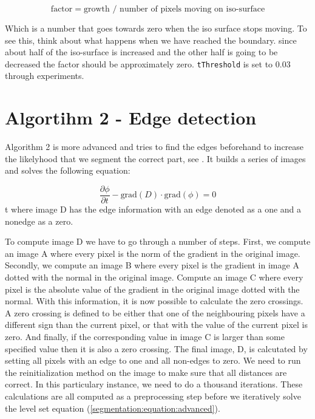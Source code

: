 \begin{equation*}
 \textrm{factor} = \textrm{growth } / \textrm{ number of pixels moving on iso-surface}
\end{equation*}

Which is a number that goes towards zero when the iso surface stops
moving. To see this, think about what happens when we have reached the
boundary. since about half of the iso-surface is increased and the
other half is going to be decreased the factor should be approximately
zero. \texttt{tThreshold} is set to 0.03 through experiments.



\section{Algortihm 2 - Edge detection}
\label{segmentation:sec:algorithm2}


Algorithm 2 is more advanced and tries to find the edges beforehand to
increase the likelyhood that we segment the correct part, see
. It builds a series of images and solves the
following equation:

\begin{equation}
\label{segmentation:equation:advanced}
  \dfrac{\partial \phi}{\partial t} - \textrm{grad}(D) \cdot \textrm{grad}(\phi) = 0
\end{equation}
t
where image D has the edge information with an edge denoted as a one and a nonedge as a zero.

To compute image D we have to go through a number of steps. First, we
compute an image A where every pixel is the norm of the gradient in
the original image. Secondly, we compute an image B where every pixel
is the gradient in image A dotted with the normal in the original
image. Compute an image C where every pixel is the absolute value of
the gradient in the original image dotted with the normal.  With this
information, it is now possible to calculate the zero crossings. A
zero crossing is defined to be either that one of the neighbouring
pixels have a different sign than the current pixel, or that with the
value of the current pixel is zero. And finally, if the corresponding
value in image C is larger than some specified value then it is also a
zero crossing. The final image, D, is calcutated by setting all pixels
with an edge to one and all non-edges to zero. We need to run the
reinitialization method on the image to make sure that all distances
are correct. In this particulary instance, we need to do a thousand
iterations. These calculations are all computed as a preprocessing
step before we iteratively solve the level set equation
(\vref*{segmentation:equation:advanced}).

